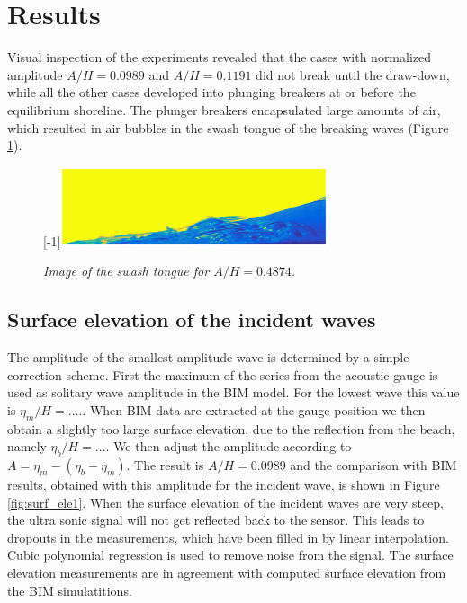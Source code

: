 \documentclass[review]{elsarticle}
\begin{document}
\section{Results}
\label{result}

Visual inspection of the experiments revealed that the cases with normalized amplitude $A/H=0.0989$ and $A/H=0.1191$ did not break until the draw-down, while all the other cases developed into plunging breakers at or before the equilibrium shoreline. The plunger breakers encapsulated large amounts of air, which resulted in air bubbles in the swash tongue of the breaking waves (Figure \ref{fig:boble_bevis}).

\begin{figure}[]
\centering
\scalebox{1}[-1]{\includegraphics[angle=180,width=0.7\textwidth]{./Figures/BUBBLE/new_jan_bilde_bub.eps}}
\caption{\textit{Image of the swash tongue for $A/H=0.4874$. }}
\label{fig:boble_bevis}
\end{figure}

\subsection{Surface elevation of the incident waves}
\label{surf_elev}
The amplitude of the smallest amplitude wave is determined by
a simple correction scheme. First the maximum of the series from the 
acoustic gauge is used as solitary wave amplitude in the BIM model.
For the lowest wave this value is $\eta_m/H=....$.
When BIM data are extracted at the gauge position we then obtain 
a slightly too large surface elevation, due to the reflection from 
the beach, namely $\eta_b/H=...$. We then adjust the amplitude 
according to $A=\eta_m-(\eta_b-\eta_m)$. 
The result is $A/H=0.0989$ and the comparison with BIM results, obtained with this amplitude for the incident wave, is shown in Figure \ref{fig:surf_ele1}. When the surface elevation of the incident waves are very steep, the ultra sonic signal will not get reflected back to the sensor. This leads to dropouts in the measurements, which have been filled in by linear interpolation.  Cubic polynomial regression is used to remove noise from the signal.  The surface elevation measurements are in agreement with computed surface elevation from  the BIM simulatitions.
\end{document}

